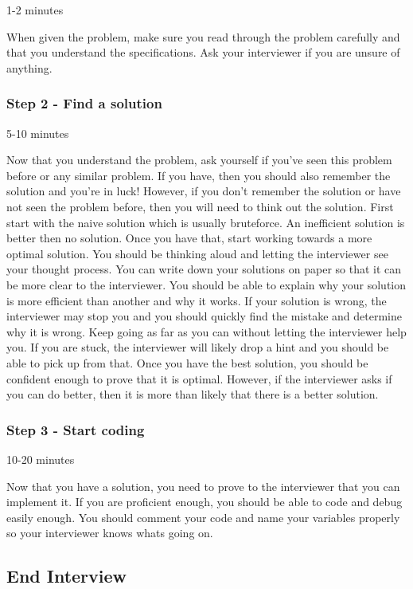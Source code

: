 \documentclass[11pt,oneside]{book}
\begin{document}
1-2 minutes

When given the problem, make sure you read through 
    the problem carefully and that you understand the specifications. Ask your interviewer if you are unsure 
    of anything.

\subsubsection{Step 2 - Find a solution}

5-10 minutes

Now that you understand the problem, ask yourself if you've seen this problem before or 
    any similar problem. If you have, then you should also remember the solution and you're in luck! 
    However, if you don't remember the solution or have not seen the problem before, then you will
    need to think out the solution. First start with the naive solution which is usually bruteforce. 
    An inefficient solution is better then no solution. Once you have that, start working towards a 
    more optimal solution. You should be thinking aloud and letting the interviewer see your thought process. 
    You can write down your solutions on paper so that it can be more clear to the interviewer. You should be able
    to explain why your solution is more efficient than another and why it works. If your solution 
    is wrong, the interviewer may stop you and you should quickly find the mistake and determine
    why it is wrong. Keep going as far as you can without letting the interviewer help you. If you are stuck,
    the interviewer will likely drop a hint and you should be able to pick up from that. Once you have the best
    solution, you should be confident enough to prove that it is optimal. However, if the interviewer asks if you can do better,
    then it is more than likely that there is a better solution.

\subsubsection{Step 3 - Start coding}

10-20 minutes

Now that you have a solution, you need to prove to the interviewer that you can implement it. If you are
    proficient enough, you should be able to code and debug easily enough. You should comment your code
    and name your variables properly so your interviewer knows whats going on.

\subsection{End Interview}
\end{document}
